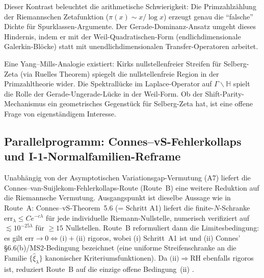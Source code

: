 \documentclass[12pt,a4paper]{article}
\theoremstyle{definition}
\theoremstyle{remark}
\begin{document}
Dieser Kontrast beleuchtet die arithmetische Schwierigkeit: Die Primzahlzählung der Riemannschen Zetafunktion ($\pi(x) \sim x/\log x$) erzeugt genau die ``falsche'' Dichte für Spurklassen-Argumente. Der Gerade-Dominanz-Ansatz umgeht dieses Hindernis, indem er mit der Weil-Quadratischen-Form (endlichdimensionale Galerkin-Blöcke) statt mit unendlichdimensionalen Transfer-Operatoren arbeitet.

Eine Yang--Mills-Analogie existiert: Kirks nullstellenfreier Streifen für Selberg-Zeta (via Ruelles Theorem) spiegelt die nullstellenfreie Region in der Primzahltheorie wider. Die Spektrallücke im Laplace-Operator auf $\Gamma \backslash \mathbb{H}$ spielt die Rolle der Gerade-Ungerade-Lücke in der Weil-Form. Ob der Shift-Parity-Mechanismus ein geometrisches Gegenstück für Selberg-Zeta hat, ist eine offene Frage von eigenständigem Interesse.

\subsection{Parallelprogramm: Connes--vS-Fehlerkollaps und I-1-Normalfamilien-Reframe}
\label{sec:parallel-route-b}

Unabhängig von der Asymptotischen Variationsgap-Vermutung (A7) liefert die Connes--van-Suijlekom-Fehlerkollaps-Route (Route~B) eine weitere Reduktion auf die Riemannsche Vermutung.
Ausgangspunkt ist dieselbe Aussage wie in Route~A: Connes--vS-Theorem~5.6 (= Schritt A1) liefert die finite-$N$-Schranke
$\mathrm{err}_\lambda \leq C e^{-c\lambda}$ für jede individuelle Riemann-Nullstelle, numerisch verifiziert auf $\lesssim 10^{-25\lambda}$ für $\geq 15$ Nullstellen.
Route~B reformuliert dann die Limitesbedingung: es gilt
$\mathrm{err} \to 0 \Longleftrightarrow \text{(i)} + \text{(ii)}$
rigoros, wobei (i) Schritt~A1 ist und (ii) Connes' \S6.6(b)/MS2-Bedingung bezeichnet (eine uniforme Streifenschranke an die Familie $\{\hat\xi_\lambda\}$ kanonischer Kriteriumsfunktionen).
Da $\text{(ii)} \Rightarrow \mathrm{RH}$ ebenfalls rigoros ist, reduziert Route~B auf die einzige offene Bedingung~(ii) \cite{Geiger2026evendom}.
\end{document}
